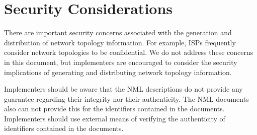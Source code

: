
\section{Security Considerations}%
\label{s:security}

% 
% 

There are important security concerns associated with the generation and distribution of network topology information. For example, ISPs frequently consider network topologies to be confidential. We do not address these concerns in this document, but implementers are encouraged to consider the security implications of generating and distributing network topology information. 

Implementers should be aware that the NML descriptions do not provide any guarantee regarding their integrity nor their authenticity. The NML documents also can not provide this for the identifiers contained in the documents. Implementers should use external means of verifying the authenticity of identifiers contained in the documents.